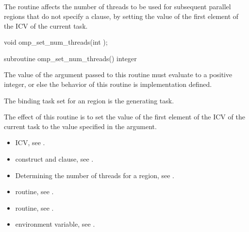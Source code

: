 \subsection{}
\label{subsec:omp_set_num_threads}
\summary
The  routine affects the number of threads to be used for
subsequent parallel regions that do not specify a  clause, by setting the
value of the first element of the  ICV of the current task.

\format
\begin{ccppspecific}
\begin{ompcFunction}
void omp_set_num_threads(int );
\end{ompcFunction}
\end{ccppspecific}

\begin{fortranspecific}
\begin{ompfSubroutine}
subroutine omp_set_num_threads()
integer 
\end{ompfSubroutine}
\end{fortranspecific}

\constraints
The value of the argument passed to this routine must evaluate to a positive integer, or
else the behavior of this routine is implementation defined.

\binding
The binding task set for an  region is the generating task.

\effect
The effect of this routine is to set the value of the first element of the  ICV
of the current task to the value specified in the argument.

\crossreferences
\begin{itemize}
\item {} ICV, see
.

\item {} construct and  clause, see
.

\item Determining the number of threads for a  region, see
.

\item {} routine, see
.

\item {} routine, see
.

\item {} environment variable, see
.
\end{itemize}









